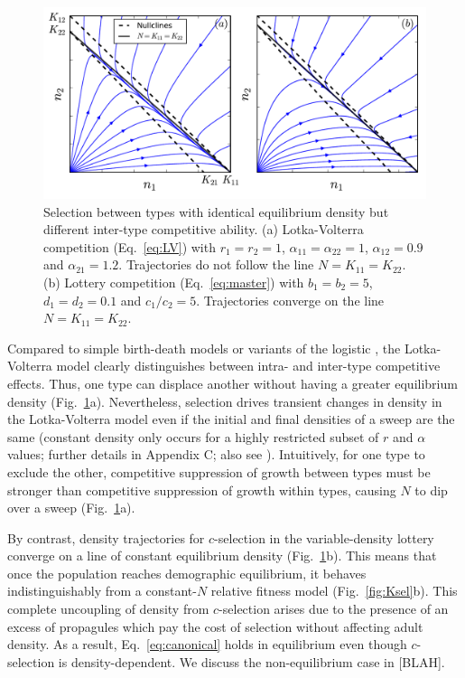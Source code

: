 \documentclass[12pt]{article}
\begin{document}
\begin{figure}
\centering
\includegraphics[scale=0.8]{LVvslottery.pdf}
\caption{\label{fig:LVvslottery} Selection between types with identical equilibrium density but different inter-type competitive ability. (a) Lotka-Volterra competition (Eq.~\ref{eq:LV}) with $r_1=r_2=1$, $\alpha_{11}=\alpha_{22}=1$, $\alpha_{12}=0.9$ and $\alpha_{21}=1.2$. Trajectories do not follow the line $N=K_{11}=K_{22}$. (b) Lottery competition (Eq.~\ref{eq:master}) with $b_1=b_2=5$, $d_1=d_2=0.1$ and $c_1/c_2=5$. Trajectories converge on the line $N=K_{11}=K_{22}$.}
\end{figure}

Compared to simple birth-death models \citep{kostitzin_1939} or variants of the logistic \citep{roughgarden_1979}, the Lotka-Volterra model clearly distinguishes between intra- and inter-type competitive effects. Thus, one type can displace another without having a greater equilibrium density (Fig.~\ref{fig:LVvslottery}a). Nevertheless, selection drives transient changes in density in the Lotka-Volterra model even if the initial and final densities of a sweep are the same (constant density only occurs for a highly restricted subset of $r$ and $\alpha$ values; further details in Appendix C; also see \citealt{mallet_2012,smouse_1976}). Intuitively, for one type to exclude the other, competitive suppression of growth between types must be stronger than competitive suppression of growth within types, causing $N$ to dip over a sweep (Fig.~\ref{fig:LVvslottery}a). 

By contrast, density trajectories for $c$-selection in the variable-density lottery converge on a line of constant equilibrium density (Fig.~\ref{fig:LVvslottery}b). This means that once the population reaches demographic equilibrium, it behaves indistinguishably from a constant-$N$ relative fitness model (Fig.~\ref{fig:Ksel}b). This complete uncoupling of density from $c$-selection arises due to the presence of an excess of propagules which pay the cost of selection without affecting adult density. As a result, Eq.~\eqref{eq:canonical} holds in equilibrium even though $c$-selection is density-dependent. We discuss the non-equilibrium case in [BLAH].
\end{document}
